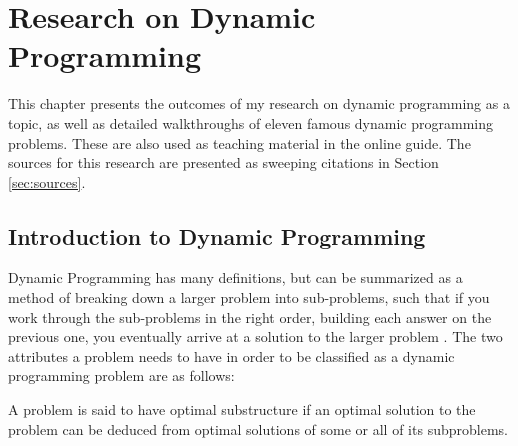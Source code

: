 \chapter{Research on Dynamic Programming}\label{chapter:research}
This chapter presents the outcomes of my research on dynamic programming as a topic, as well as detailed walkthroughs of eleven famous dynamic programming problems. These are also used as teaching material in the online guide.
The sources for this research are presented as sweeping citations in Section \ref{sec:sources}.

\section{Introduction to Dynamic Programming}
Dynamic Programming has many definitions, but can be summarized as a method of breaking down a larger problem into sub-problems, such that if you work through the sub-problems in the right order, building each answer on the previous one, you eventually arrive at a solution to the larger problem \cite{conversableeconomist}.
The two attributes a problem needs to have in order to be classified as a dynamic programming problem are as follows:

\begin{definition}
    A problem is said to have optimal substructure if an optimal solution to the problem can be deduced from optimal solutions of some or all of its subproblems.
\end{definition}

